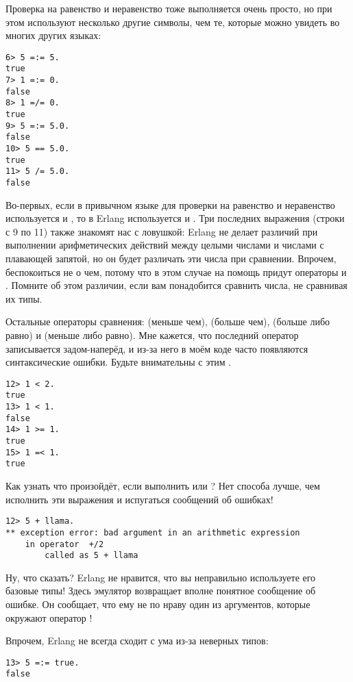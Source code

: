 Проверка на равенство и неравенство тоже выполняется очень просто, но при этом используют несколько другие символы, чем те, которые можно увидеть во многих других языках:
\begin{lstlisting}[style=repl]
6> 5 =:= 5.
true
7> 1 =:= 0.
false
8> 1 =/= 0.
true
9> 5 =:= 5.0.
false
10> 5 == 5.0.
true
11> 5 /= 5.0.
false
\end{lstlisting}

Во\--первых, если в привычном языке для проверки на равенство и неравенство используется \ops{==} и \ops{!=}, то в Erlang используется \ops{=:=} и \ops{=/=}.
Три последних выражения (строки с 9 по 11) также знакомят нас с ловушкой: Erlang не делает различий при выполнении арифметических действий между целыми числами и числами с плавающей запятой, но он будет различать эти числа при сравнении.
Впрочем, беспокоиться не о чем, потому что в этом случае на помощь придут операторы \ops{==} и \ops{/=}.
Помните об этом различии, если вам понадобится сравнить числа, не сравнивая их типы.

Остальные операторы сравнения: \ops{$<$} (меньше чем), \ops{$>$} (больше чем), \ops{$>=$} (больше либо равно) и \ops{$=<$} (меньше либо равно).
Мне кажется, что последний оператор записывается задом\--наперёд, и из\--за него в моём коде часто появляются синтаксические ошибки.
Будьте внимательны с этим \ops{$=<$}.
\begin{lstlisting}[style=repl]
12> 1 < 2.
true
13> 1 < 1.
false
14> 1 >= 1.
true
15> 1 =< 1.
true
\end{lstlisting}

Как узнать что произойдёт, если выполнить  или ?
Нет способа лучше, чем исполнить эти выражения и испугаться сообщений об ошибках!
\begin{lstlisting}[style=repl]
12> 5 + llama.
** exception error: bad argument in an arithmetic expression
    in operator  +/2
        called as 5 + llama
\end{lstlisting}

Ну, что сказать?
Erlang не нравится, что вы неправильно используете его базовые типы!
Здесь эмулятор возвращает вполне понятное сообщение об ошибке.
Он сообщает, что ему не по нраву один из аргументов, которые окружают оператор \ops{+}!

Впрочем, Erlang не всегда сходит с ума из\--за неверных типов:
\begin{lstlisting}[style=repl]
13> 5 =:= true.
false
\end{lstlisting}

